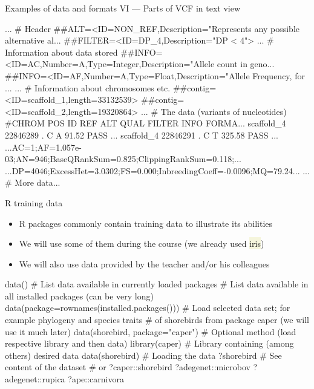 \documentclass[compress, ucs, xelatex, 11pt, xcolor=svgnames, aspectratio=169,
	hyperref={
		bookmarks=true,
		unicode=true,
		colorlinks=true,
		pdftitle={Molecular data in R},
		plainpages=false,
		pdfauthor={Vojtech Zeisek},
		pdfsubject={Course about phylogeny and evolution in R},
		pdfcreator={XeLaTeX},
		pdfkeywords={R, evolution, phylogeny, molecular data},
		linkcolor=Crimson, %
		anchorcolor=Magenta, %
		citecolor=Magenta, %
		filecolor=Magenta, %
		menucolor=Magenta, %
		urlcolor=DodgerBlue, %
		pdftex},
	url={hyphens, lowtilde} %
	]{beamer}
\renewcommand{\texttt}[1]{\colorbox{Beige}{{\ttfamily #1}}}
\begin{document}
\begin{frame}[fragile]{Examples of data and formats VI --- Parts of VCF in text view}
	\begin{spluscode}
    ... # Header
    ##ALT=<ID=NON_REF,Description="Represents any possible alternative al...
    ##FILTER=<ID=DP_4,Description="DP < 4">
    ... # Information about data stored
    ##INFO=<ID=AC,Number=A,Type=Integer,Description="Allele count in geno...
    ##INFO=<ID=AF,Number=A,Type=Float,Description="Allele Frequency, for ...
    ... # Information about chromosomes etc.
    ##contig=<ID=scaffold_1,length=33132539>
    ##contig=<ID=scaffold_2,length=19320864>
    ... # The data (variants of nucleotides)
    #CHROM  POS     ID      REF     ALT     QUAL    FILTER  INFO    FORMA...
    scaffold_4      22846289        .       C       A       91.52   PASS ...
    scaffold_4      22846291        .       C       T       325.58  PASS ...
    ...AC=1;AF=1.057e-03;AN=946;BaseQRankSum=0.825;ClippingRankSum=0.118;...
    ...DP=4046;ExcessHet=3.0302;FS=0.000;InbreedingCoeff=-0.0096;MQ=79.24...
    ... # More data...
	\end{spluscode}
\end{frame}

\begin{frame}[fragile]{R training data}
	\begin{itemize}
		\item R packages commonly contain training data to illustrate its abilities
		\item We will use some of them during the course (we already used \texttt{iris})
		\item We will also use data provided by the teacher and/or his colleagues
	\end{itemize}
	\begin{spluscode}
    data() # List data available in currently loaded packages
    # List data available in all installed packages (can be very long)
    data(package=rownames(installed.packages()))
    # Load selected data set; for example phylogeny and species traits
    # of shorebirds from package caper (we will use it much later)
    data(shorebird, package="caper")
    # Optional method (load respective library and then data)
    library(caper) # Library containing (among others) desired data
    data(shorebird) # Loading the data
    ?shorebird # See content of the dataset # or ?caper::shorebird
    ?adegenet::microbov
    ?adegenet::rupica
    ?ape::carnivora
	\end{spluscode}
\end{frame}
\end{document}
